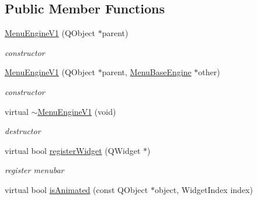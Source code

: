 \subsection*{Public Member Functions}
\begin{DoxyCompactItemize}
\item 
\mbox{\label{class_menu_engine_v1_a9b44d96750af247ee29ed4f20c592813}} 
\hyperlink{class_menu_engine_v1_a9b44d96750af247ee29ed4f20c592813}{Menu\+Engine\+V1} (Q\+Object $\ast$parent)
\begin{DoxyCompactList}\small\item\em constructor \end{DoxyCompactList}\item 
\mbox{\label{class_menu_engine_v1_ad71deb0f2319e75a62758ad7747e4a30}} 
\hyperlink{class_menu_engine_v1_ad71deb0f2319e75a62758ad7747e4a30}{Menu\+Engine\+V1} (Q\+Object $\ast$parent, \hyperlink{class_menu_base_engine}{Menu\+Base\+Engine} $\ast$other)
\begin{DoxyCompactList}\small\item\em constructor \end{DoxyCompactList}\item 
\mbox{\label{class_menu_engine_v1_a715379ad607fa0aacfe1d5734fd4db81}} 
virtual \hyperlink{class_menu_engine_v1_a715379ad607fa0aacfe1d5734fd4db81}{$\sim$\+Menu\+Engine\+V1} (void)
\begin{DoxyCompactList}\small\item\em destructor \end{DoxyCompactList}\item 
\mbox{\label{class_menu_engine_v1_a474b539c9efff4ab347b12d3123ed955}} 
virtual bool \hyperlink{class_menu_engine_v1_a474b539c9efff4ab347b12d3123ed955}{register\+Widget} (Q\+Widget $\ast$)
\begin{DoxyCompactList}\small\item\em register menubar \end{DoxyCompactList}\item 
\mbox{\label{class_menu_engine_v1_a81bebb14042c97d38008f30fa645ae1e}} 
virtual bool \hyperlink{class_menu_engine_v1_a81bebb14042c97d38008f30fa645ae1e}{is\+Animated} (const Q\+Object $\ast$object, Widget\+Index index)

\end{DoxyCompactItemize}
